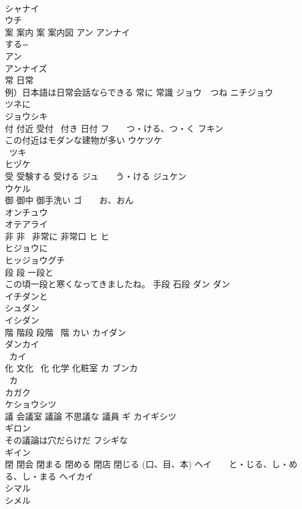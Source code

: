 \documentclass[8pt]{extreport}
\begin{document}
\begin{CJK}{UTF8}{min}
\\	シャナイ 
\\	ウチ 
\\	案 案内 案 案内図	アン アンナイ 
\\	する= 
\\	アン 
\\	アンナイズ 
\\	常 日常 
\\	例）日本語は日常会話ならできる 常に 常識	ジョウ　つね ニチジョウ 
\\	ツネに 
\\	ジョウシキ 
\\	付 付近 受付 ~付き 日付	フ　　つ・ける、つ・く フキン 
\\	この付近はモダンな建物が多い ウケツケ 
\\	~ツキ 
\\	ヒヅケ 
\\	受 受験する 受ける	ジュ　　う・ける ジュケン 
\\	ウケル 
\\	御 御中 御手洗い	ゴ　　お、おん 
\\	オンチュウ 
\\	オテアライ 
\\	非 非~ 非常に 非常口	ヒ ヒ~　
\\	ヒジョウに 
\\	ヒッジョウグチ 
\\	段 段 一段と 
\\	この頃一段と寒くなってきましたね。 手段 石段	ダン ダン 
\\	イチダンと 
\\	シュダン 
\\	イシダン 
\\	階 階段 段階 ~階	カい カイダン　
\\	ダンカイ 
\\	~カイ 
\\	化 文化 ~化 化学 化粧室	カ ブンカ 
\\	~カ 
\\	カガク 
\\	ケショウシツ 
\\	議 会議室 議論 不思議な 議員	ギ カイギシツ　
\\	ギロン 
\\	その議論は穴だらけだ フシギな 
\\	ギイン 
\\	閉 閉会 閉まる 閉める 閉店 閉じる (口、目、本)	ヘイ　　と・じる、し・める、し・まる ヘイカイ　
\\	シマル 
\\	シメル 

\end{CJK}
\end{document}
